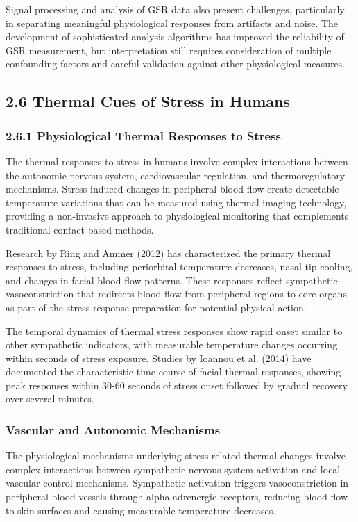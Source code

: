 \documentclass[11pt,a4paper]{article}
\begin{document}
Signal processing and analysis of GSR data also present challenges, particularly in separating meaningful physiological
responses from artifacts and noise. The development of sophisticated analysis algorithms has improved the reliability of
GSR measurement, but interpretation still requires consideration of multiple confounding factors and careful validation
against other physiological measures.

\subsection{2.6 Thermal Cues of Stress in Humans}

\subsubsection{2.6.1 Physiological Thermal Responses to Stress}

The thermal responses to stress in humans involve complex interactions between the autonomic nervous system,
cardiovascular regulation, and thermoregulatory mechanisms. Stress-induced changes in peripheral blood flow create
detectable temperature variations that can be measured using thermal imaging technology, providing a non-invasive
approach to physiological monitoring that complements traditional contact-based methods.

Research by Ring and Ammer (2012) has characterized the primary thermal responses to stress, including periorbital
temperature decreases, nasal tip cooling, and changes in facial blood flow patterns. These responses reflect sympathetic
vasoconstriction that redirects blood flow from peripheral regions to core organs as part of the stress response
preparation for potential physical action.

The temporal dynamics of thermal stress responses show rapid onset similar to other sympathetic indicators, with
measurable temperature changes occurring within seconds of stress exposure. Studies by Ioannou et al. (2014) have
documented the characteristic time course of facial thermal responses, showing peak responses within 30-60 seconds of
stress onset followed by gradual recovery over several minutes.

\subsubsection{Vascular and Autonomic Mechanisms}

The physiological mechanisms underlying stress-related thermal changes involve complex interactions between sympathetic
nervous system activation and local vascular control mechanisms. Sympathetic activation triggers vasoconstriction in
peripheral blood vessels through alpha-adrenergic receptors, reducing blood flow to skin surfaces and causing measurable
temperature decreases.
\end{document}
